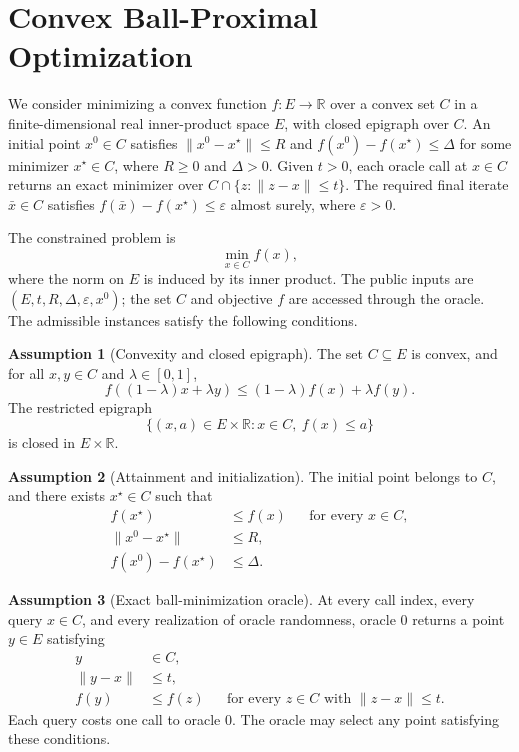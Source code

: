 \documentclass[10pt]{article}
\theoremstyle{definition}
\newtheorem{assumption}{Assumption}
\begin{document}
\section*{Convex Ball-Proximal Optimization}
We consider minimizing a convex function $f:E\to\mathbb{R}$ over a convex set $C$ in a finite-dimensional real inner-product space $E$, with closed epigraph over $C$. An initial point $x^0\in C$ satisfies $\|x^0-x^\star\|\leq R$ and $f(x^0)-f(x^\star)\leq\Delta$ for some minimizer $x^\star\in C$, where $R\geq0$ and $\Delta>0$. Given $t>0$, each oracle call at $x\in C$ returns an exact minimizer over $C\cap\{z:\|z-x\|\leq t\}$. The required final iterate $\bar{x}\in C$ satisfies $f(\bar{x})-f(x^\star)\leq\varepsilon$ almost surely, where $\varepsilon>0$.

The constrained problem is
\[
\min_{x\in C} f(x),
\]
where the norm on $E$ is induced by its inner product. The public inputs are $(E,t,R,\Delta,\varepsilon,x^0)$; the set $C$ and objective $f$ are accessed through the oracle. The admissible instances satisfy the following conditions.

\begin{assumption}[Convexity and closed epigraph]
The set $C\subseteq E$ is convex, and for all $x,y\in C$ and $\lambda\in[0,1]$,
\[
f((1-\lambda)x+\lambda y)
\leq (1-\lambda)f(x)+\lambda f(y).
\]
The restricted epigraph
\[
\{(x,a)\in E\times\mathbb{R}:x\in C,\ f(x)\leq a\}
\]
is closed in $E\times\mathbb{R}$.
\end{assumption}

\begin{assumption}[Attainment and initialization]
The initial point belongs to $C$, and there exists $x^\star\in C$ such that
\begin{align*}
f(x^\star) &\leq f(x) &&\text{for every }x\in C,\\
\|x^0-x^\star\| &\leq R,\\
f(x^0)-f(x^\star) &\leq\Delta.
\end{align*}
\end{assumption}

\begin{assumption}[Exact ball-minimization oracle]
At every call index, every query $x\in C$, and every realization of oracle randomness, oracle $0$ returns a point $y\in E$ satisfying
\begin{align*}
y &\in C,\\
\|y-x\| &\leq t,\\
f(y) &\leq f(z)
&&\text{for every }z\in C\text{ with }\|z-x\|\leq t.
\end{align*}
Each query costs one call to oracle $0$. The oracle may select any point satisfying these conditions.
\end{assumption}
\end{document}
